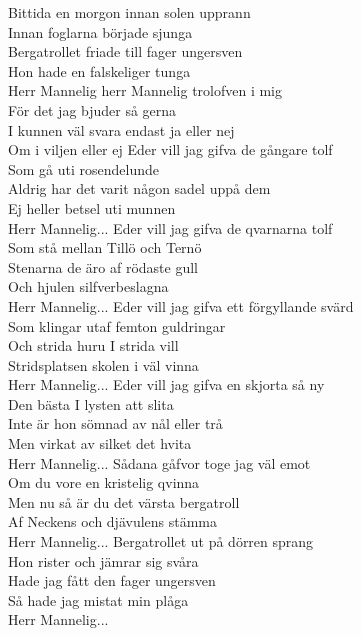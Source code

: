 \begin{flushleft}

Bittida en morgon innan solen upprann\\
Innan foglarna började sjunga\\
Bergatrollet friade till fager ungersven\\
Hon hade en falskeliger tunga\\
\hops
\hspace{0.9cm}Herr Mannelig herr Mannelig trolofven i mig\\
\hspace{0.9cm}För det jag bjuder så gerna\\
\hspace{0.9cm}I kunnen väl svara endast ja eller nej\\
\hspace{0.9cm}Om i viljen eller ej
\hops
Eder vill jag gifva de gångare tolf\\
Som gå uti rosendelunde\\
Aldrig har det varit någon sadel uppå dem\\
Ej heller betsel uti munnen\\
\hops
\hspace{0.9cm}Herr Mannelig...
\hops
Eder vill jag gifva de qvarnarna tolf\\
Som stå mellan Tillö och Ternö\\
Stenarna de äro af rödaste gull\\
Och hjulen silfverbeslagna\\
\hops
\hspace{0.9cm}Herr Mannelig...
\hops
Eder vill jag gifva ett förgyllande svärd\\
Som klingar utaf femton guldringar\\
Och strida huru I strida vill\\
Stridsplatsen skolen i väl vinna\\
\hops
\hspace{0.9cm}Herr Mannelig...
\hops
Eder vill jag gifva en skjorta så ny\\
Den bästa I lysten att slita\\
Inte är hon sömnad av nål eller trå\\
Men virkat av silket det hvita\\
\hops
\hspace{0.9cm}Herr Mannelig...
\hops
Sådana gåfvor toge jag väl emot\\
Om du vore en kristelig qvinna\\
Men nu så är du det värsta bergatroll\\
Af Neckens och djävulens stämma\\
\hops
\hspace{0.9cm}Herr Mannelig...
\hops
Bergatrollet ut på dörren sprang\\
Hon rister och jämrar sig svåra\\
Hade jag fått den fager ungersven\\
Så hade jag mistat min plåga\\
\hops
\hspace{0.9cm}Herr Mannelig...
\end{flushleft}
\newpage